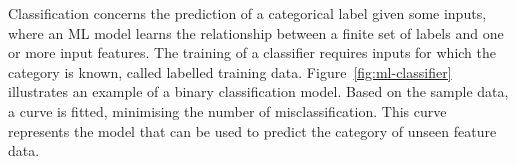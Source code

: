 Classification concerns the prediction of a categorical label given some inputs, where an ML model learns the relationship between a finite set of labels and one or more input features.
The training of a classifier requires inputs for which the category is known, called labelled training data.
Figure~\ref{fig:ml-classifier} illustrates an example of a binary classification model.
Based on the sample data, a curve is fitted, minimising the number of misclassification.
This curve represents the model that can be used to predict the category of unseen feature data.


